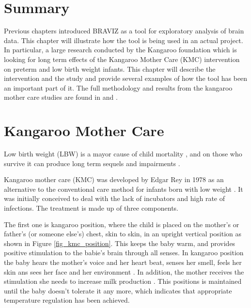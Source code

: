 \label{chap_kmc400}

\section{Summary}

Previous chapters introduced BRAVIZ as a tool for exploratory analysis of brain data. This chapter will illustrate how the tool is being used in an actual project. In particular, a large research conducted by the Kangaroo foundation which is looking for long term effects of the Kangaroo Mother Care (KMC) intervention on preterm and low birth weight infants. This chapter will describe the intervention and the study and provide several examples of how the tool has been an important part of it. The full methodology and results from the kangaroo mother care studies are found in \autocite{schneider_cerebral_2012} and \autocite{charpak_final_2015}.

\section{Kangaroo Mother Care}

Low birth weight (LBW) is a mayor cause of child mortality \autocite{wardlaw_low_2005}, and on those who survive it can produce long term sequels and impairments \autocite{nosarti_neurodevelopmental_2010}. 

Kangaroo mother care (KMC) was developed by Edgar Rey in 1978 \autocite{rey_rational_1983} as an alternative to the conventional care method for infants born with low weight \autocite{conde-agudelo_kangaroo_2003}. It was initially conceived to deal with the lack of incubators and high rate of infections. The treatment is made up of three components.

The first one is kangaroo position, where the child is placed on the mother's or father's (or someone else's) chest, skin to skin, in an upright vertical position as shown in Figure \ref{fig_kmc_position}. This keeps the baby warm, and provides positive stimulation to the babie's brain through all senses. In kangaroo position the baby hears the mother's voice and her heart beat, senses her smell, feels her skin ans sees her face and her environment \autocite{tessier_kangaroo_2003}. In addition, the mother receives the stimulation she needs to increase milk production \autocite{charpak_kangaroo_2005}. This positions is maintained until the baby doesn't tolerate it any more, which indicates that appropriate temperature regulation has been achieved. 

